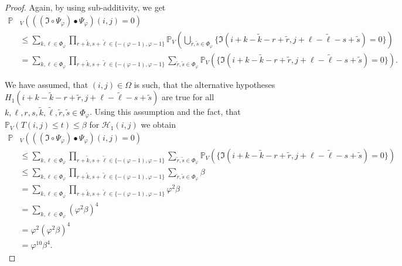 \documentclass[a4paper,12pt]{article}
\theoremstyle{plain}
\theoremstyle{definition}
\numberwithin{equation}{section}
\begin{document}
\begin{appendix}
\begin{proof}
		Again, by using sub-additivity, we get
		\begin{align*}
			\mathbb{P}&_V\left( ((\mathfrak{I} \circ \Psi_\varphi) \bullet \Psi_\varphi)(i, j) = 0 \right) \\
			&\leq \sum_{k, \ell \in \Phi_\varphi} \prod_{r + \tilde{k}, s + \tilde{\ell} \in \{ - ( \varphi - 1 ), \varphi - 1 \}} \mathbb{P}_V\left( \bigcup_{\tilde{r}, \tilde{s} \in \Phi_\varphi} \{ \mathfrak{I}(i + k - \tilde{k} - r + \tilde{r}, j + \ell - \tilde{\ell} - s + \tilde{s}) = 0 \} \right) \\
			&= \sum_{k, \ell \in \Phi_\varphi} \prod_{r + \tilde{k}, s + \tilde{\ell} \in \{ - ( \varphi - 1 ), \varphi - 1 \}} \sum_{\tilde{r}, \tilde{s} \in \Phi_\varphi} \mathbb{P}_V\left( \{ \mathfrak{I}(i + k - \tilde{k} - r + \tilde{r}, j + \ell - \tilde{\ell} - s + \tilde{s}) = 0 \} \right).
		\end{align*}
		
		We have assumed, that $(i, j) \in \Omega$ is such, that the alternative hypotheses $H_1(i + k - \tilde{k} - r + \tilde{r}, j + \ell - \tilde{\ell} - s + \tilde{s})$ are true for all $k, \ell, r, s, \tilde{k}, \tilde{\ell}, \tilde{r}, \tilde{s} \in \Phi_\varphi$. Using this assumption and the fact, that $\mathbb{P}_V\left( T(i, j) \leq t \right) \leq \beta$ for $\mathcal{H}_1(i, j)$ we obtain
		\begin{align*}
			\mathbb{P}&_V\left( ((\mathfrak{I} \circ \Psi_\varphi) \bullet \Psi_\varphi)(i, j) = 0 \right) \\
			&\leq \sum_{k, \ell \in \Phi_\varphi} \prod_{r + \tilde{k}, s + \tilde{\ell} \in \{ - ( \varphi - 1 ), \varphi - 1 \}} \sum_{\tilde{r}, \tilde{s} \in \Phi_\varphi} \mathbb{P}_V\left( \{ \mathfrak{I}(i + k - \tilde{k} - r + \tilde{r}, j + \ell - \tilde{\ell} - s + \tilde{s}) = 0 \} \right) \\
			&\leq \sum_{k, \ell \in \Phi_\varphi} \prod_{r + \tilde{k}, s + \tilde{\ell} \in \{ - ( \varphi - 1 ), \varphi - 1 \}} \sum_{\tilde{r}, \tilde{s} \in \Phi_\varphi} \beta \\
			&= \sum_{k, \ell \in \Phi_\varphi} \prod_{r + \tilde{k}, s + \tilde{\ell} \in \{ - ( \varphi - 1 ), \varphi - 1 \}} \varphi^2 \beta \\
			&= \sum_{k, \ell \in \Phi_\varphi} ( \varphi^2 \beta )^4 \\
			&= \varphi^2 ( \varphi^2 \beta )^4 \\
			&= \varphi^{10} \beta^4.
		\end{align*}
		

\end{proof}
\end{appendix}
\end{document}
